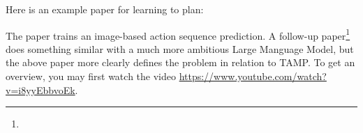

\renewcommand{\course}{Robot Learning}
\renewcommand{\coursedate}{Summer 2024}
\renewcommand{\exnum}{Weekly Exercise 10}

\renewcommand{\teacher}{Marc Toussaint \& Wolfgang H{\"o}nig}
\renewcommand{\addressTUB}{
  Learning~\&~Intelligent~Systems Lab, Intelligent Multi-Robot Coordination Lab, TU~Berlin\\\small
  Marchstr. 23, 10587 Berlin, Germany
}

\exercises


\providecommand{\SE}{\text{SE}}


\exercisestitle



Here is an example paper for learning to plan:


The paper trains an image-based action sequence prediction. A follow-up
paper\footnote{}
does something similar with a much more ambitious Large Manguage
Model, but the above paper more clearly defines the problem in
relation to TAMP. To get an overview,
you may first watch the video {\urlfont\url{https://www.youtube.com/watch?v=i8yyEbbvoEk}}.

